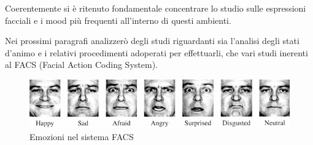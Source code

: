 \begin{preface}
    Coerentemente si è ritenuto fondamentale concentrare lo studio sulle espressioni facciali e i mood più frequenti all’interno di questi ambienti.
    
    Nei prossimi paragrafi analizzerò degli studi riguardanti sia l’analisi degli stati d’animo e i relativi procedimenti adoperati per effettuarli, che vari studi inerenti al FACS (Facial Action Coding System).
    
    \begin{figure}
        \includegraphics[width=1\linewidth]{images/1.png}
        \caption{Emozioni nel sistema FACS}
    \end{figure}
\end{preface}